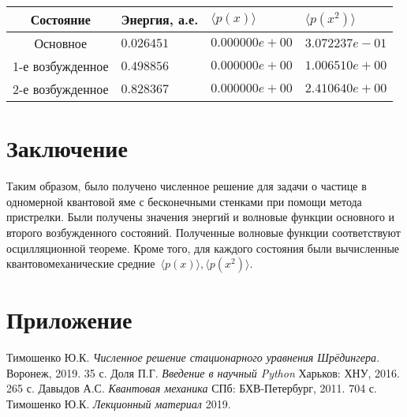 \documentclass[a4paper,12pt]{article}
\begin{document}
\noindent
\begin{tabularx}{\linewidth}{|c|X|X|X|}
    \hline
    \textbf{Состояние}&\textbf{Энергия, а.е.}&\textbf{$\langle p(x) \rangle$}&\textbf{$\langle p(x^2) \rangle$} \\
    \hline
    Основное & $0.026451$ & $0.000000e+00$ & $3.072237e-01$\\
    \hline
    1-е возбужденное & $0.498856$ & $0.000000e+00$ & $1.006510e+00$\\
    \hline
    2-е возбужденное & $0.828367$ & $0.000000e+00$ & $2.410640e+00$\\
    \hline
\end{tabularx}

\newpage

\section{Заключение}\label{sec:zakl}

Таким образом, было получено численное решение для задачи о частице в одномерной квантовой яме с бесконечными стенками при помощи метода пристрелки.
Были получены значения энергий и волновые функции основного и второго возбужденного состояний.
Полученные волновые функции соответствуют осцилляционной теореме.
Кроме того, для каждого состояния были вычисленные квантовомеханические средние~$\langle p(x) \rangle, \langle p(x^2) \rangle$.

\newpage

\appendix

\section*{Приложение}\label{sec:extras}



\newpage
\begin{thebibliography}{9}
 Тимошенко Ю.К. \textit{Численное решение стационарного уравнения Шрёдингера.} Воронеж, 2019. 35 с.
 Доля П.Г. \textit{Введение в научный Python} Харьков: ХНУ, 2016. 265 с.
 Давыдов А.С. \textit{Квантовая механика} СПб: БХВ-Петербург, 2011. 704 с.
 Тимошенко Ю.К. \textit{Лекционный материал} 2019.
\end{thebibliography}
\end{document}
